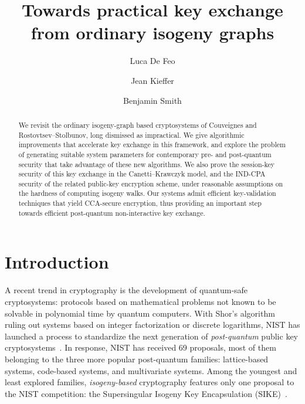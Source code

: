 \documentclass{llncs}
\begin{document}
\title{Towards practical key exchange from ordinary isogeny graphs}
\author{
  Luca De Feo \and
  Jean Kieffer \and
  Benjamin Smith}

\maketitle

\begin{abstract}
    We revisit the ordinary isogeny-graph based cryptosystems
    of Couveignes and Rostovtsev--Stolbunov,
    long dismissed as impractical.
    We give algorithmic improvements that accelerate key exchange
    in this framework,
    and explore the problem of generating suitable system parameters
    for contemporary pre- and post-quantum security that take
		advantage of these new algorithms.
    We also prove the session-key security of this key exchange
    in the Canetti--Krawczyk model,
    and the IND-CPA security of the related public-key encryption scheme,
    under reasonable assumptions on the hardness of computing isogeny walks.
    Our systems admit efficient key-validation techniques that
    yield CCA-secure encryption,
    thus providing an important step towards
    efficient post-quantum non-interactive key exchange.

\end{abstract}

\section{Introduction}
\label{sec:introduction}

A recent trend in cryptography is the development of quantum-safe
cryptosystems: protocols based on mathematical problems not known to
be solvable in polynomial time by quantum computers. With Shor's
algorithm~\cite{shor1994algorithms} ruling out systems based on
integer factorization or discrete logarithms, NIST has launched a
process to standardize the next generation of \emph{post-quantum}
public key cryptosystems~\cite{NIST2016}. In response, NIST has
received 69 proposals, most of them belonging to the three more
popular post-quantum families: lattice-based systems, code-based
systems, and multivariate systems. Among the youngest and least
explored families, \emph{isogeny-based} cryptography features only one
proposal to the NIST competition: the Supersingular Isogeny Key
Encapsulation (SIKE)~\cite{SIKE}.
\end{document}
